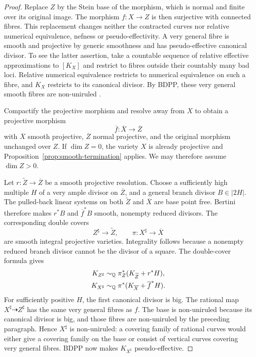 \begin{proof}
Replace $Z$ by the Stein base of the morphism, which is normal and finite
over its original image.  The morphism $f:X\to Z$ is then surjective with
connected fibres.  This replacement changes neither the contracted
curves nor relative numerical equivalence, nefness or pseudo-effectivity.
A very general fibre is smooth and projective by generic smoothness and
has pseudo-effective canonical divisor.  To see the latter assertion,
take a countable sequence of relative effective approximations to
$[K_X]$ and restrict to fibres outside their countably many bad loci.
Relative numerical equivalence restricts to numerical equivalence on
such a fibre, and $K_X$ restricts to its canonical divisor.  By BDPP,
these very general smooth fibres are non-uniruled
\cite[Theorem~0.2 and Corollary~0.3]{BDPP}.

Compactify the projective morphism and resolve away from $X$ to obtain a
projective morphism
\[
 \overline f:\overline X\longrightarrow\overline Z
\]
with $\overline X$ smooth projective, $\overline Z$ normal projective, and
the original morphism unchanged over $Z$.  If $\dim Z=0$, the variety $X$
is already projective and Proposition~\ref{prop:smooth-termination}
applies.  We may therefore assume $\dim Z>0$.

Let $r:\widetilde Z\to\overline Z$ be a smooth projective resolution.
Choose a sufficiently high multiple $H$ of a very ample divisor on
$\overline Z$, and a general branch divisor $B\in|2H|$.  The pulled-back
linear systems on both $\widetilde Z$ and $\overline X$ are base point
free.  Bertini therefore makes $r^*B$ and $\overline f^*B$ smooth,
nonempty reduced divisors.  The corresponding double covers
\[
 Z^\sharp\longrightarrow\widetilde Z,
 \qquad \pi:X^\sharp\longrightarrow\overline X
\]
are smooth integral projective varieties.  Integrality follows because a
nonempty reduced branch divisor cannot be the divisor of a square.  The
double-cover formula gives
\begin{equation}\label{glob:double-cover}
 \begin{aligned}
 K_{Z^\sharp}&\sim_\mathbb Q
     \pi_Z^*(K_{\widetilde Z}+r^*H),\\
 K_{X^\sharp}&\sim_\mathbb Q
     \pi^*(K_{\overline X}+\overline f^*H).
 \end{aligned}
\end{equation}
For sufficiently positive $H$, the first canonical divisor is big.
The rational map $X^\sharp\dashrightarrow Z^\sharp$ has the same very
general fibres as $f$.  The base is non-uniruled because its canonical
divisor is big, and those fibres are non-uniruled by the preceding
paragraph.  Hence $X^\sharp$ is non-uniruled: a covering family of rational
curves would either give a covering family on the base or consist of
vertical curves covering very general fibres.  BDPP now makes
$K_{X^\sharp}$ pseudo-effective.


\end{proof}
